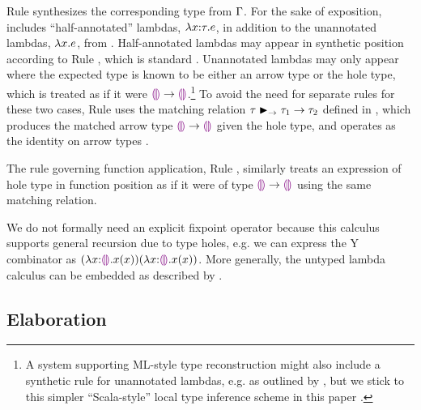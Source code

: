 Rule  synthesizes the corresponding type from $\Gamma$.
For the sake of exposition, \HazelnutLive includes ``half-annotated'' lambdas, $\lambda x{:}\tau.e$, in addition to the unannotated lambdas, $\lambda x.e$, from \Hazelnut.
%
Half-annotated lambdas may appear in synthetic position according to Rule , which is standard \cite{Chlipala:2005da}.
%
Unannotated lambdas may only appear where the expected type is known to be either an arrow type or the hole type, which is treated as if it were $\textcolor{violet}{\llparenthesis}\textcolor{violet}{\rrparenthesis} \rightarrow \textcolor{violet}{\llparenthesis}\textcolor{violet}{\rrparenthesis}$.\footnote{A system supporting ML-style type reconstruction \cite{damas1982principal} might also include a synthetic rule for unannotated lambdas, e.g. as outlined by \citet{DBLP:conf/icfp/DunfieldK13}, but we stick to this simpler ``Scala-style'' local type inference scheme in this paper \cite{Pierce:2000ve,Odersky:2001lb}.} 
%
To avoid the need for separate rules for these two cases, Rule  uses the matching relation $\tau \blacktriangleright_{\rightarrow} \tau_1 \rightarrow \tau_2$ defined in , which produces the matched arrow type $\textcolor{violet}{\llparenthesis}\textcolor{violet}{\rrparenthesis} \rightarrow \textcolor{violet}{\llparenthesis}\textcolor{violet}{\rrparenthesis}$ given the hole type, and operates as the identity on arrow types \cite{DBLP:conf/snapl/SiekVCB15,DBLP:conf/popl/GarciaC15}.
%
%
%
%

The rule governing function application, Rule , similarly treats an expression of hole type in function position as if it were of type $\textcolor{violet}{\llparenthesis}\textcolor{violet}{\rrparenthesis} \rightarrow \textcolor{violet}{\llparenthesis}\textcolor{violet}{\rrparenthesis}$ using the same matching relation.

We do not formally need an explicit fixpoint operator because this calculus supports general recursion due to type holes, e.g. we can express the Y combinator as $(\lambda x{:}\textcolor{violet}{\llparenthesis}\textcolor{violet}{\rrparenthesis}.x(x)) (\lambda x{:}\textcolor{violet}{\llparenthesis}\textcolor{violet}{\rrparenthesis}.x(x))$. More generally, the untyped lambda calculus can be embedded as described by \citet{Siek06a}.

\vspace{-4px}
\subsection{Elaboration}
\label{sec:elaboration}
\vspace{-1px}


